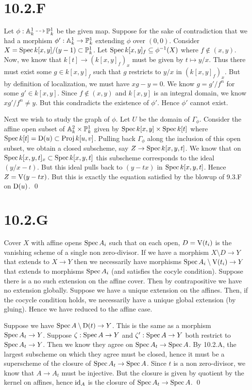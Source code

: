 \documentclass{article}
\begin{document}
\section{10.2.F}
Let $\phi: \A_k^1 \rationalto \P_k^1$ be the given map. Suppose for the sake of
contradiction that we had a morphism $\phi': \mathbb{A}_k^1 \to \mathbb{P}_k^1$ extending
$\phi$ over $(0, 0)$. Consider
$X=\operatorname{Spec} k[x, y]/(y-1) \subset \mathbb{P}_k^1$. Let $\operatorname{Spec} k[x, y]_f \subseteq \phi^{-1}(X)$ where
$f \notin (x, y)$. Now, we know that $k[t] \to (k[x, y]_f)_x$ must be
given by $t \mapsto y/x$. Thus there must exist some
$g \in k[x, y]_f$ such that $g$ restricts to
$y/x$ in $(k[x, y]_f)_x$. But by definition of
localization, we must have $xg-y=0$. We know
$g=g'/f^n$ for some $g' \in k[x, y]$. Since
$f \notin (x, y)$ and $k[x,y]$ is an integral domain, we
know $xg'/f^n \neq y$. But this condradicts the existence of
$\phi'$. Hence $\phi'$ cannot exist.

Next we wish to study the graph of $\phi$. Let
$U$ be the domain of $\Gamma_\phi$. Consider the
affine open subset of $\mathbb{A}_k^2 \times \mathbb{P}^1_k$ given by $\operatorname{Spec} k[x,y] \times \operatorname{Spec}
    k[t]$
where $\operatorname{Spec} k[t] = \operatorname{D}(u) \subset \operatorname{Proj}
    k[u, v]$. Pulling back $\Gamma_\phi$ along the
inclusion of this open subset, we obtain a closed subscheme, say
$Z \to \operatorname{Spec} k[x,y,t]$. We know that on $\operatorname{Spec} k[x,y,t]_x \subset \operatorname{Spec}
    k[x,y,t]$ this subscheme
corresponds to the ideal $(y/x-t)$. But this ideal pulls back to
$(y-tx)$ in $\operatorname{Spec} k[x,y,t]$. Hence
$Z=\operatorname{V}(y-tx)$. But this is exactly the equation satisfied by the
blowup of 9.3.F on $\operatorname{D}(u)$. \qed

\section{10.2.G}
Cover $X$ with affine opens $\operatorname{Spec} A_i$ such
that on each open, $D=\operatorname{V}(t_i)$ is the vanishing scheme of a single
non zero-divisor. If we have a morphism $X \setminus D \to Y$ that extends to
$X \to Y$ then we necessarily have morphisms
$\operatorname{Spec} A_i \setminus \operatorname{V}(t_i) \to Y$ that extends to morphisms $\operatorname{Spec} A_i$ (and
satisfies the cocyle condition). Suppose there is a no such extension on the
affine cover. Then by contrapositive we have no extension globally. Suppose we
have a unique extension on the affines. Then, if the cocycle condition holds,
we necessarily have a unique global extension (by gluing). Hence we have
reduced to the affine case.

Suppose we have $\operatorname{Spec} A \setminus \operatorname{D}(t) \to Y$. This is the same as a morphism
$\operatorname{Spec} A_t \to Y$. Suppose $\zeta: \operatorname{Spec} A \to Y$ and
$\zeta': \operatorname{Spec} A \to Y$ both restrict to $\operatorname{Spec} A_t \to Y$. Then we know
they agree on $\operatorname{Spec} A_t \to \operatorname{Spec} A$. By 10.2.A, the largest subscheme on
which they agree must be closed, hence it must be a superscheme of the closure
of $\operatorname{Spec} A_t \to \operatorname{Spec} A$. Since $t$ is a non
zero-divisor, we know that $A \to A_t$ must be injective. But the
closure is given by quotient by the kernel on affines, hence
$\operatorname{id}_A$ is the closure of $\operatorname{Spec} A_t \to \operatorname{Spec} A$. \qed
\end{document}
